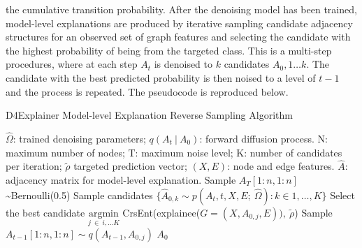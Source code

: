 \documentclass[
  11pt,
  letterpaper,
]{article}
\begin{document}
the cumulative transition probability. After the denoising model has
been trained, model-level explanations are produced by iterative
sampling candidate adjacency structures for an observed set of graph
features and selecting the candidate with the highest probability of
being from the targeted class. This is a multi-step procedures, where at
each step \(A_t\) is denoised to \(k\) candidates \(A_0, 1 \dots k\).
The candidate with the best predicted probability is then noised to a
level of \(t-1\) and the process is repeated. The pseudocode is
reproduced below.

\begin{algorithm}
    \caption{D4Explainer Model-level Explanation Reverse Sampling Algorithm}\label{alg:cap}
    \begin{algorithmic}
        \Require $\hat \Omega$: trained denoising parameters; 
                $q(A_t \ | \ A_0)$: forward diffusion process.
        \renewcommand{\algorithmicrequire}{\textbf{Input:}}
        \renewcommand{\algorithmicensure}{\textbf{Output:}}
        \Require N: maximum number of nodes; T: maximum noise level; 
                K: number of candidates per iteration; 
                $\tilde{\rho}$ targeted prediction vector; 
                $(X, E)$: node and edge features.  
        \Ensure $\hat A$: adjacency matrix for model-level explanation.
        \State Sample $A_T[1:n, 1:n]$ \sim Bernoulli(0.5)
            \State Sample candidates 
                $\{\hat A_{0, k} \sim p(A_t,t, X, E; \ \hat \Omega) : k \in 1, \dots, K\}$
            \State Select the best candidate 
            $\underset{j \ \in \ i, \dots K}{\text{argmin}}$ 
            CrsEnt(explainee($G = (X, A_{0, j}, E)), \ \tilde{\rho}$)
            \State Sample $A_{t-1}[1:n, 1:n] \sim q(A_{t-1}, A_{0, j})$
        \EndFor
        \State \Return $A_0$
    \end{algorithmic}
    \end{algorithm}
\end{document}
